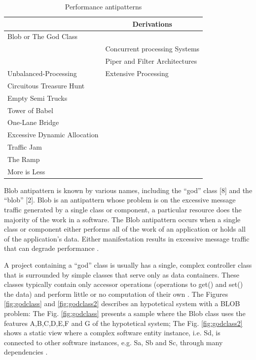 \begin{table}[H]
\centering
\caption{Performance antipatterns}
\label{antipatterns}
\begin{tabular}{|l|l|}
\hline
\rowcolor[HTML]{C0C0C0} 
\multicolumn{1}{|c|}{\cellcolor[HTML]{C0C0C0}\textbf{antipattern}} & \multicolumn{1}{c|}{\cellcolor[HTML]{C0C0C0}\textbf{Derivations}} \\ \hline
Blob or The God Class &  \\ \hline
 & Concurrent processing Systems \\ \cline{2-2} 
 & Piper and Filter Architectures \\ \cline{2-2} 
\multirow{-3}{*}{Unbalanced-Processing} & Extensive Processing \\ \hline
Circuitous Treasure Hunt &  \\ \cline{1-1}
Empty Semi Trucks &  \\ \cline{1-1}
Tower of Babel &  \\ \cline{1-1}
One-Lane Bridge &  \\ \cline{1-1}
Excessive Dynamic Allocation &  \\ \cline{1-1}
Traffic Jam &  \\ \cline{1-1}
The Ramp  &  \\ \cline{1-1}
More is Less & \multirow{-10}{*}{} \\ \hline
\end{tabular}
\end{table}

Blob antipattern is known by various names, including the “god” class [8] and the “blob” [2]. Blob is an antipattern whose problem is on the excessive message traffic generated by a single class or component, a particular resource does the majority of the work in a software. The Blob antipattern occurs when a single class or component either performs all of the work of an application or holds all of the application’s data. Either manifestation results in excessive message traffic that can degrade performance \cite{Cortellessa2007} \cite{Smith2000}.

A project containing a “god” class is usually has a single, complex controller class that is surrounded by simple classes that serve only as data containers. These classes typically contain only accessor operations (operations to get() and set() the data) and perform little or no computation of their own \cite{Smith2000}.
The  Figures \ref{fig:godclass} and \ref{fig:godclass2} describes an hypotetical system with a BLOB problem:
The Fig. \ref{fig:godclass} presents a sample where the Blob class uses the features A,B,C,D,E,F and G of the hypotetical system; The Fig. \ref{fig:godclass2}  shows a static view where  a complex software entity instance, i.e. Sd, is connected to other software instances, e.g. Sa, Sb and Sc, through many dependencies \cite{Vetoio2011}\cite{Wert2013a}.




